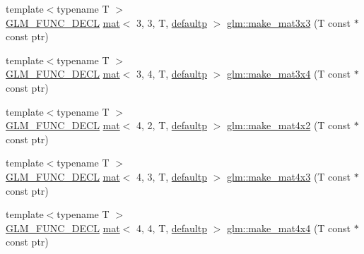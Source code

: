 \begin{DoxyCompactItemize}
\item 
{\footnotesize template$<$typename T $>$ }\\\mbox{\hyperlink{setup_8hpp_ab2d052de21a70539923e9bcbf6e83a51}{G\+L\+M\+\_\+\+F\+U\+N\+C\+\_\+\+D\+E\+CL}} \mbox{\hyperlink{structglm_1_1mat}{mat}}$<$ 3, 3, T, \mbox{\hyperlink{namespaceglm_a36ed105b07c7746804d7fdc7cc90ff25a9d21ccd8b5a009ec7eb7677befc3bf51}{defaultp}} $>$ \mbox{\hyperlink{group__gtc__type__ptr_gaf2e8337b15c3362aaeb6e5849e1c0536}{glm\+::make\+\_\+mat3x3}} (T const $\ast$const ptr)
\item 
{\footnotesize template$<$typename T $>$ }\\\mbox{\hyperlink{setup_8hpp_ab2d052de21a70539923e9bcbf6e83a51}{G\+L\+M\+\_\+\+F\+U\+N\+C\+\_\+\+D\+E\+CL}} \mbox{\hyperlink{structglm_1_1mat}{mat}}$<$ 3, 4, T, \mbox{\hyperlink{namespaceglm_a36ed105b07c7746804d7fdc7cc90ff25a9d21ccd8b5a009ec7eb7677befc3bf51}{defaultp}} $>$ \mbox{\hyperlink{group__gtc__type__ptr_ga05dd66232aedb993e3b8e7b35eaf932b}{glm\+::make\+\_\+mat3x4}} (T const $\ast$const ptr)
\item 
{\footnotesize template$<$typename T $>$ }\\\mbox{\hyperlink{setup_8hpp_ab2d052de21a70539923e9bcbf6e83a51}{G\+L\+M\+\_\+\+F\+U\+N\+C\+\_\+\+D\+E\+CL}} \mbox{\hyperlink{structglm_1_1mat}{mat}}$<$ 4, 2, T, \mbox{\hyperlink{namespaceglm_a36ed105b07c7746804d7fdc7cc90ff25a9d21ccd8b5a009ec7eb7677befc3bf51}{defaultp}} $>$ \mbox{\hyperlink{group__gtc__type__ptr_ga8b34c9b25bf3310d8ff9c828c7e2d97c}{glm\+::make\+\_\+mat4x2}} (T const $\ast$const ptr)
\item 
{\footnotesize template$<$typename T $>$ }\\\mbox{\hyperlink{setup_8hpp_ab2d052de21a70539923e9bcbf6e83a51}{G\+L\+M\+\_\+\+F\+U\+N\+C\+\_\+\+D\+E\+CL}} \mbox{\hyperlink{structglm_1_1mat}{mat}}$<$ 4, 3, T, \mbox{\hyperlink{namespaceglm_a36ed105b07c7746804d7fdc7cc90ff25a9d21ccd8b5a009ec7eb7677befc3bf51}{defaultp}} $>$ \mbox{\hyperlink{group__gtc__type__ptr_ga0330bf6640092d7985fac92927bbd42b}{glm\+::make\+\_\+mat4x3}} (T const $\ast$const ptr)
\item 
{\footnotesize template$<$typename T $>$ }\\\mbox{\hyperlink{setup_8hpp_ab2d052de21a70539923e9bcbf6e83a51}{G\+L\+M\+\_\+\+F\+U\+N\+C\+\_\+\+D\+E\+CL}} \mbox{\hyperlink{structglm_1_1mat}{mat}}$<$ 4, 4, T, \mbox{\hyperlink{namespaceglm_a36ed105b07c7746804d7fdc7cc90ff25a9d21ccd8b5a009ec7eb7677befc3bf51}{defaultp}} $>$ \mbox{\hyperlink{group__gtc__type__ptr_ga8f084be30e404844bfbb4a551ac2728c}{glm\+::make\+\_\+mat4x4}} (T const $\ast$const ptr)

\end{DoxyCompactItemize}

